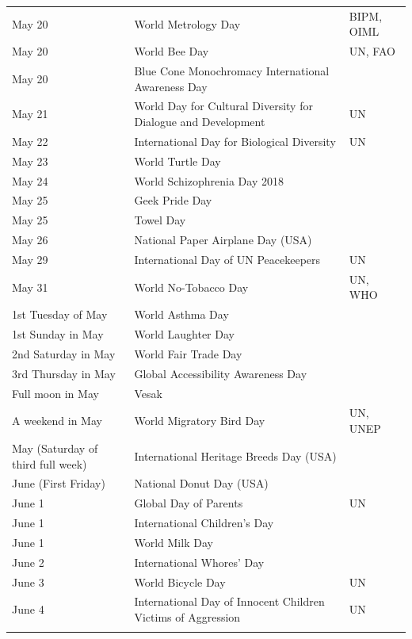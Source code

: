 \documentclass[
  openany]{book}
\begin{document}
\begin{longtable}[t]{>{\raggedright\arraybackslash}p{8em}>{\raggedright\arraybackslash}p{18em}>{\raggedright\arraybackslash}p{10em}}
\rowcolor{gray!6}  May 20 & World Metrology Day & BIPM, OIML\\
\addlinespace
May 20 & World Bee Day & UN, FAO\\
\rowcolor{gray!6}  May 20 & Blue Cone Monochromacy International Awareness Day & \\
May 21 & World Day for Cultural Diversity for Dialogue and Development & UN\\
\rowcolor{gray!6}  May 22 & International Day for Biological Diversity & UN\\
May 23 & World Turtle Day & \\
\addlinespace
\rowcolor{gray!6}  May 24 & World Schizophrenia Day 2018 & \\
May 25 & Geek Pride Day & \\
\rowcolor{gray!6}  May 25 & Towel Day & \\
May 26 & National Paper Airplane Day (USA) & \\
\rowcolor{gray!6}  May 29 & International Day of UN Peacekeepers & UN\\
\addlinespace
May 31 & World No-Tobacco Day & UN, WHO\\
\rowcolor{gray!6}  1st Tuesday of May & World Asthma Day & \\
1st Sunday in May & World Laughter Day & \\
\rowcolor{gray!6}  2nd Saturday in May & World Fair Trade Day & \\
3rd Thursday in May & Global Accessibility Awareness Day & \\
\addlinespace
\rowcolor{gray!6}  Full moon in May & Vesak & \\
A weekend in May & World Migratory Bird Day & UN, UNEP\\
\rowcolor{gray!6}  May (Saturday of third full week) & International Heritage Breeds Day (USA) & \\
June (First Friday) & National Donut Day (USA) & \\
\rowcolor{gray!6}  June 1 & Global Day of Parents & UN\\
\addlinespace
June 1 & International Children's Day & \\
\rowcolor{gray!6}  June 1 & World Milk Day & \\
June 2 & International Whores' Day & \\
\rowcolor{gray!6}  June 3 & World Bicycle Day & UN\\
June 4 & International Day of Innocent Children Victims of Aggression & UN\\
\addlinespace

\end{longtable}
\end{document}
